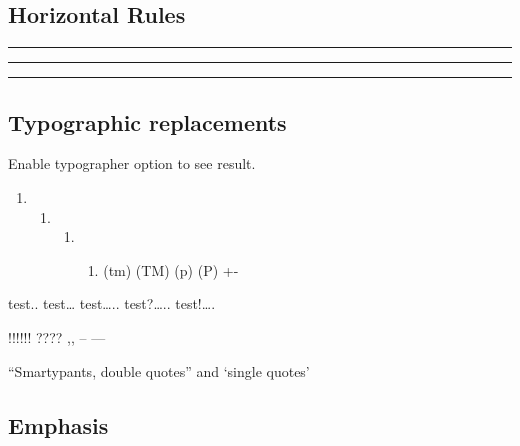 \documentclass[]{article}
\providecommand{\tightlist}{%
  \setlength{\itemsep}{0pt}\setlength{\parskip}{0pt}}
\begin{document}
\subsection{Horizontal Rules}\label{horizontal-rules}

\begin{center}\rule{0.5\linewidth}{\linethickness}\end{center}

\begin{center}\rule{0.5\linewidth}{\linethickness}\end{center}

\begin{center}\rule{0.5\linewidth}{\linethickness}\end{center}

\subsection{Typographic replacements}\label{typographic-replacements}

Enable typographer option to see result.

\begin{enumerate}
\def\labelenumi{(\alph{enumi})}
\setcounter{enumi}{2}
\item
  \begin{enumerate}
  \def\labelenumii{(\Alph{enumii})}
  \setcounter{enumii}{2}
  \item
    \begin{enumerate}
    \def\labelenumiii{(\alph{enumiii})}
    \setcounter{enumiii}{17}
    \item
      \begin{enumerate}
      \def\labelenumiv{(\Alph{enumiv})}
      \setcounter{enumiv}{17}
      \tightlist
      \item
        (tm) (TM) (p) (P) +-
      \end{enumerate}
    \end{enumerate}
  \end{enumerate}
\end{enumerate}

test.. test\ldots{} test\ldots{}.. test?\ldots{}.. test!\ldots{}.

!!!!!! ???? ,, -- ---

``Smartypants, double quotes'' and `single quotes'

\subsection{Emphasis}\label{emphasis}
\end{document}
